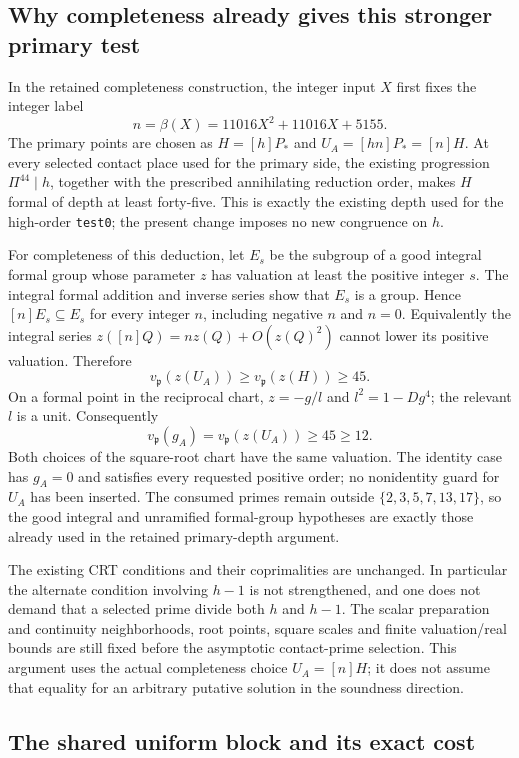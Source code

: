 \subsection{Why completeness already gives this stronger primary test}

In the retained completeness construction, the integer input $X$ first
fixes the integer label
\[
 n=\beta(X)=11016X^2+11016X+5155.
\]
The primary points are chosen as $H=[h]P_*$ and $U_A=[hn]P_*=[n]H$.
At every selected contact place used for the primary side, the existing
progression $\Pi^{44}\mid h$, together with the prescribed annihilating
reduction order, makes $H$ formal of depth at least forty-five. This is
exactly the existing depth used for the high-order \texttt{test0}; the
present change imposes no new congruence on $h$.

For completeness of this deduction, let $E_s$ be the subgroup of a good
integral formal group whose parameter $z$ has valuation at least the
positive integer $s$. The integral formal addition and inverse series
show that $E_s$ is a group. Hence $[n]E_s\subseteq E_s$ for every integer
$n$, including negative $n$ and $n=0$. Equivalently the integral series
$z([n]Q)=n z(Q)+O(z(Q)^2)$ cannot lower its positive valuation. Therefore
\[
 v_{\mathfrak p}(z(U_A))\ge
 v_{\mathfrak p}(z(H))\ge45.
\]
On a formal point in the reciprocal chart,
$z=-g/l$ and $l^2=1-Dg^4$; the relevant $l$ is a unit. Consequently
\[
 v_{\mathfrak p}(g_A)=v_{\mathfrak p}(z(U_A))\ge45\ge12.
\]
Both choices of the square-root chart have the same valuation. The
identity case has $g_A=0$ and satisfies every requested positive order;
no nonidentity guard for $U_A$ has been inserted. The consumed primes
remain outside $\{2,3,5,7,13,17\}$, so the good integral and unramified
formal-group hypotheses are exactly those already used in the retained
primary-depth argument.

The existing CRT conditions and their coprimalities are unchanged.
In particular the alternate condition involving $h-1$ is not strengthened,
and one does not demand that a selected prime divide both $h$ and $h-1$.
The scalar preparation and continuity neighborhoods, root points, square
scales and finite valuation/real bounds are still fixed before the
asymptotic contact-prime selection. This argument uses the actual
completeness choice $U_A=[n]H$; it does not assume that equality for an
arbitrary putative solution in the soundness direction.

\subsection{The shared uniform block and its exact cost}

